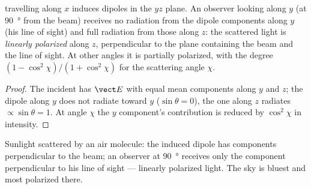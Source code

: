 \begin{proposition}\label{prop:b2:dipole-radiation:polarization}
 travelling along $x$ induces dipoles in the $yz$ plane.
An observer looking along $y$ (at \qty{90}{\degree} from the beam) receives
no radiation from the dipole components along $y$ (his line of sight)
and full radiation from those along $z$: the scattered light is
\emph{linearly polarized} along $z$, perpendicular to the plane
containing the beam and the line of sight. At other angles it is
partially polarized, with the degree $(1 - \cos^2\chi)/(1 + \cos^2\chi)$ for
the scattering angle $\chi$.
\end{proposition}

\begin{proof}
The incident  has $\vect E$ with equal mean components
along $y$ and $z$; the dipole along $y$ does not radiate toward $y$ ($\sin
\theta = 0$), the one along $z$ radiates $\propto\sin\theta = 1$. At angle $\chi$
the $y$ component's contribution is reduced by $\cos^2\chi$ in intensity.
\end{proof}

\begin{omfigure}

{\small Sunlight scattered by an air molecule: the induced dipole has
components perpendicular to the beam; an observer at \qty{90}{\degree}
receives only the component perpendicular to his line of sight ---
linearly polarized light. The sky is bluest and most polarized there.}
\end{omfigure}

